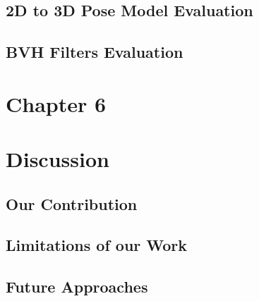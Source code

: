 \documentclass[12pt,oneside,a4paper,english]{article}
\begin{document}
\subsection{2D to 3D Pose Model Evaluation}

\subsection{BVH Filters Evaluation}

\newpage
\section*{Chapter 6 \\}
\section{Discussion}

\subsection{Our Contribution}

\subsection{Limitations of our Work}

\subsection{Future Approaches}


\newpage
 
%  

\label{EndOfText}

\label{endOfDoc}
\end{document}
